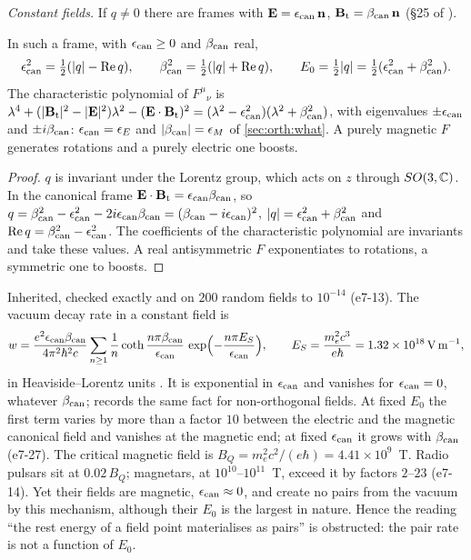 \emph{Constant fields.} If $q\neq0$ there are frames with $\bE=\epsilon_{\rm can}\,\mathbf n$, $\Btext=\beta_{\rm can}\,\mathbf n$ (\S25 of \cite{LandauLifshitz2}).

\begin{proposition}
\label{e7:prop:canon}
In such a frame, with $\epsilon_{\rm can}\ge0$ and $\beta_{\rm can}$ real,
\[
\epsilon_{\rm can}^2=\half(|q|-\Re q),\qquad \beta_{\rm can}^2=\half(|q|+\Re q),\qquad E_0=\half|q|=\half(\epsilon_{\rm can}^2+\beta_{\rm can}^2).
\]
The characteristic polynomial of $F^\mu{}_\nu$ is $\lambda^4+(|\Btext|^2-|\bE|^2)\lambda^2-(\bE\cdot\Btext)^2=(\lambda^2-\epsilon_{\rm can}^2)(\lambda^2+\beta_{\rm can}^2)$, with
eigenvalues $\pm\epsilon_{\rm can}$ and $\pm i\beta_{\rm can}$: $\epsilon_{\rm can}=\epsilon_E$ and $|\beta_{\rm can}|=\epsilon_M$ of \cref{sec:orth:what}. A purely magnetic $F$
generates rotations and a purely electric one boosts.
\end{proposition}

\begin{proof}
$q$ is invariant under the Lorentz group, which acts on $z$ through $SO(3,\C)$. In the canonical frame $\bE\cdot\Btext=\epsilon_{\rm can}\beta_{\rm can}$, so
$q=\beta_{\rm can}^2-\epsilon_{\rm can}^2-2i\epsilon_{\rm can}\beta_{\rm can}=(\beta_{\rm can}-i\epsilon_{\rm can})^2$, $|q|=\epsilon_{\rm can}^2+\beta_{\rm can}^2$ and $\Re q=\beta_{\rm can}^2-\epsilon_{\rm can}^2$. The coefficients of the
characteristic polynomial are invariants and take these values. A real antisymmetric $F$ exponentiates to rotations, a symmetric one to boosts.
\end{proof}

Inherited, checked exactly and on $200$ random fields to $10^{-14}$ (e7-13). The vacuum decay rate in a constant field is
\[
w=\frac{e^2\epsilon_{\rm can}\beta_{\rm can}}{4\pi^2\hbar^2c}\sum_{n\ge1}\frac1n\coth\frac{n\pi\beta_{\rm can}}{\epsilon_{\rm can}}\,\exp\Bigl(-\frac{n\pi E_S}{\epsilon_{\rm can}}\Bigr),\qquad
E_S=\frac{m_e^2c^3}{e\hbar}=1.32\times10^{18}\,{\rm V\,m^{-1}},
\]
in Heaviside--Lorentz units \cite{Schwinger51,HeisenbergEuler36}. It is exponential in $\epsilon_{\rm can}$ and vanishes for $\epsilon_{\rm can}=0$, whatever $\beta_{\rm can}$;
 records the same fact for non-orthogonal fields. At fixed $E_0$ the first term varies by more than a factor $10$
between the electric and the magnetic canonical field and vanishes at the magnetic end; at fixed $\epsilon_{\rm can}$ it grows with $\beta_{\rm can}$ (e7-27). The
critical magnetic field is $B_Q=m_e^2c^2/(e\hbar)=4.41\times10^9$~T. Radio pulsars sit at $0.02\,B_Q$; magnetars, at $10^{10}$--$10^{11}$~T, exceed
it by factors $2$--$23$ \cite{KaspiBeloborodov17} (e7-14). Yet their fields are magnetic, $\epsilon_{\rm can}\approx0$, and create no pairs from the vacuum by
this mechanism, although their $E_0$ is the largest in nature. Hence the reading ``the rest energy of a field point materialises as pairs'' is
obstructed: the pair rate is not a function of $E_0$.

